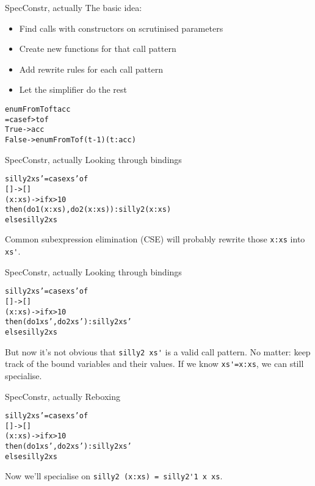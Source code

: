 \documentclass[t]{beamer}
\newcommand{\oomph}[1]{\textcolor[rgb]{0.0,0.5,0.9}{#1}}
\begin{document}
\begin{frame}[fragile]{SpecConstr, actually}
The basic idea:
\begin{itemize}
\item Find calls with constructors \oomph{on scrutinised parameters}
\item Create new functions for that call pattern
\item Add rewrite rules for each call pattern
\item Let the simplifier do the rest
\end{itemize}

\begin{alltt}
enumFromTo f t acc
 = case f > t of
   True  -> acc
   False -> enumFromTo f (t-1) (t : acc)
\end{alltt}

\end{frame}

\begin{frame}[fragile]{SpecConstr, actually}
Looking through bindings

\begin{alltt}
silly2 xs' = case xs' of
 []     -> []
 (x:xs) -> if   x > 10
           then (do1 \oomph{(x:xs)}, do2 \oomph{(x:xs)}) : silly2 \oomph{(x:xs)}
           else silly2 xs
\end{alltt}

Common subexpression elimination (CSE) will probably rewrite those \verb/x:xs/ into \verb/xs'/.
\end{frame}

\begin{frame}[fragile]{SpecConstr, actually}
Looking through bindings

\begin{alltt}
silly2 xs' = case xs' of
 []     -> []
 (x:xs) -> if   x > 10
           then (do1 \oomph{   xs'}, do2 \oomph{   xs'}) : silly2 \oomph{   xs'}
           else silly2 xs
\end{alltt}

But now it's not obvious that \verb/silly2 xs'/ is a valid call pattern.
No matter: keep track of the bound variables and their values. If we know \verb/xs'=x:xs/, we can still specialise.
\end{frame}

\begin{frame}[fragile]{SpecConstr, actually}
Reboxing

\begin{alltt}
silly2 xs' = case xs' of
 []     -> []
 (x:xs) -> if   x > 10
           then (do1    xs', do2    xs') : \oomph{silly2    xs'}
           else silly2 xs
\end{alltt}

Now we'll specialise on \verb/silly2 (x:xs) = silly2'1 x xs/.
\end{frame}
\end{document}
